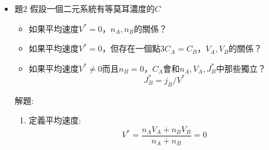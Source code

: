 \documentclass[../main.tex]{subfiles}
\begin{document}
\begin{itemize}
\begin{enumerate}
    \item 剩下一個條件還沒用到，$C_{B0}$:\\
    因為整個細菌離不開薄膜，所以:
    \begin{equation}
      \int_0^L C_B dz = C_{B0} L
    \end{equation}
    \item 代入$C_B$:
    \begin{align}
      \int_0^L C_4 \exp\left[-
        \frac{\chi S_0}{D_B L}z\right] dz &= C_{B0} L\\
      C_4 \left[
        -\frac{D_B L}{\chi S_0} \exp\left(-
        \frac{\chi S_0}{D_B L}z\right)
      \right]_0^L &= C_{B0} L\\
      C_4 \frac{D_B L}{\chi S_0} \left(
        1 - \exp\left(-\frac{\chi S_0}{D_B}\right)
      \right) &= C_{B0} L
    \end{align}
    \item 解出$C_4$:
    \begin{equation}
      C_4 = \frac{C_{B0} \chi S_0}{D_B \left(
        1 - \exp\left(-\frac{\chi S_0}{D_B}\right)
      \right)}
    \end{equation}
    \item 最後解出$C_B(z)$:
    \begin{equation}
      \boxed{C_B(z) = \frac{C_{B0} \chi S_0}{D_B \left(
        1 - \exp\left(-\frac{\chi S_0}{D_B}\right)
      \right)} \exp\left(-
        \frac{\chi S_0}{D_B L}z\right)}
    \end{equation}
  \end{enumerate}
  \item 題2 假設一個二元系統有等莫耳濃度的$C$
  \begin{itemize}
    \item 如果平均速度$V^\ast=0$，$n_A,n_B$的關係？
    \item 如果平均速度$V^\ast=0$，但存在一個點$3C_A=C_B$，$V_A,V_B$的關係？
    \item 如果平均速度$V^\ast\neq0$而且$n_B=0$，$C_A$會和$n_A,V_A,J_B^\ast$中那些獨立？
    \begin{equation}
      J_B^\ast = j_B/V^\ast
    \end{equation}
  \end{itemize}
  解題:
  \begin{enumerate}
    \item 定義平均速度:
    \begin{equation}
      V^\ast = \frac{n_A V_A +n_B V_B}{n_A + n_B} = 0
    \end{equation}

\end{enumerate}
\end{itemize}
\end{document}

